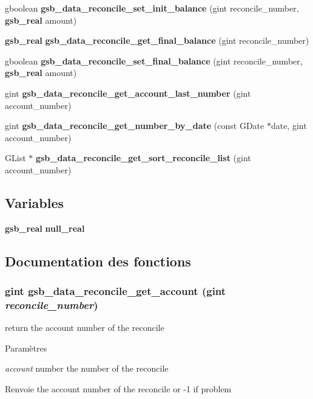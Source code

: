 \begin{DoxyCompactItemize}
\item 
gboolean {\bf gsb\_\-data\_\-reconcile\_\-set\_\-init\_\-balance} (gint reconcile\_\-number, {\bf gsb\_\-real} amount)
\item 
{\bf gsb\_\-real} {\bf gsb\_\-data\_\-reconcile\_\-get\_\-final\_\-balance} (gint reconcile\_\-number)
\item 
gboolean {\bf gsb\_\-data\_\-reconcile\_\-set\_\-final\_\-balance} (gint reconcile\_\-number, {\bf gsb\_\-real} amount)
\item 
gint {\bf gsb\_\-data\_\-reconcile\_\-get\_\-account\_\-last\_\-number} (gint account\_\-number)
\item 
gint {\bf gsb\_\-data\_\-reconcile\_\-get\_\-number\_\-by\_\-date} (const GDate $\ast$date, gint account\_\-number)
\item 
GList $\ast$ {\bf gsb\_\-data\_\-reconcile\_\-get\_\-sort\_\-reconcile\_\-list} (gint account\_\-number)
\end{DoxyCompactItemize}
\subsection*{Variables}
\begin{DoxyCompactItemize}
\item 
{\bf gsb\_\-real} {\bf null\_\-real}
\end{DoxyCompactItemize}


\subsection{Documentation des fonctions}
\subsubsection[{gsb\_\-data\_\-reconcile\_\-get\_\-account}]{\setlength{\rightskip}{0pt plus 5cm}gint gsb\_\-data\_\-reconcile\_\-get\_\-account (gint {\em reconcile\_\-number})}\label{gsb__data__reconcile_8c_a57f4a52c653f13e27564fc8ff2b4350b}
return the account number of the reconcile


\begin{DoxyParams}{Paramètres}
\item[{\em account}]number the number of the reconcile\end{DoxyParams}
\begin{DoxyReturn}{Renvoie}
the account number of the reconcile or -\/1 if problem 
\end{DoxyReturn}


